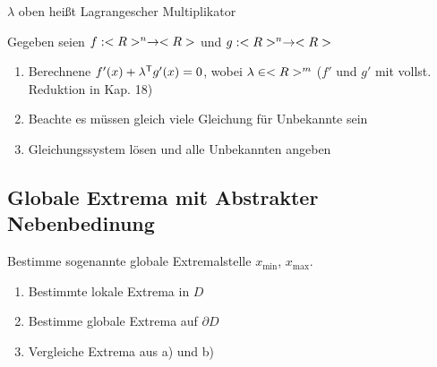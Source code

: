 \begin{*definition}
	$\lambda$ oben heißt Lagrangescher Multiplikator
\end{*definition}

\begin{boldenvironment}\vspace*{0pt}
	Gegeben seien $f: <R>^n \to <R>$ und $g: <R>^n \to <R>$
	\begin{enumerate}[label={\alph*)},topsep=\dimexpr-\baselineskip/2\relax]
		\item Berechnene $f'(x) + \lambda^\mathsf{T} g'(x) = 0$, wobei $\lambda \in <R>^m$ ($f'$ und $g'$ mit vollst. Reduktion in Kap. 18)
		\item Beachte es müssen gleich viele Gleichung für Unbekannte sein
		\item Gleichungssystem lösen und alle Unbekannten angeben
	\end{enumerate}
\end{boldenvironment}

\subsection{Globale Extrema mit Abstrakter Nebenbedinung}
\begin{boldenvironment}[Frage]
	Bestimme sogenannte globale Extremalstelle $x_{\min}$, $x_{\max}$.
\end{boldenvironment}

\begin{boldenvironment}[Strategie]\vspace*{0pt}
	\begin{enumerate}[label={\alph*)},topsep=\dimexpr-\baselineskip/2\relax]
		\item Bestimmte lokale Extrema in $D$
		\item Bestimme globale Extrema auf $\partial D$
		\item Vergleiche Extrema aus a) und b)
	\end{enumerate}
\end{boldenvironment}